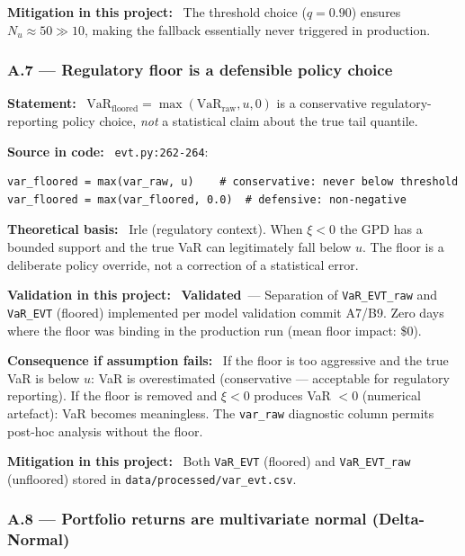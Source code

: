 \documentclass[11pt,a4paper]{article}
\newcommand{\asmfield}[1]{\medskip\noindent\textbf{#1:}\ }
\newcommand{\code}[1]{\texttt{#1}}
\newcommand{\validated}{\textbf{Validated}}
\begin{document}
\asmfield{Mitigation in this project}
The threshold choice ($q = 0.90$) ensures $N_u \approx 50 \gg 10$,
making the fallback essentially never triggered in production.

\subsubsection{A.7 --- Regulatory floor is a defensible policy choice}\label{asm:A7}

\asmfield{Statement}
$\text{VaR}_{\text{floored}} = \max(\text{VaR}_{\text{raw}}, u, 0)$ is a
conservative regulatory-reporting policy choice, \emph{not} a statistical
claim about the true tail quantile.

\asmfield{Source in code}
\code{evt.py:262-264}:
\begin{lstlisting}
var_floored = max(var_raw, u)    # conservative: never below threshold
var_floored = max(var_floored, 0.0)  # defensive: non-negative
\end{lstlisting}

\asmfield{Theoretical basis}
Irle (regulatory context). When $\xi < 0$ the GPD has a bounded support
and the true VaR can legitimately fall below $u$. The floor is a
deliberate policy override, not a correction of a statistical error.

\asmfield{Validation in this project}
\validated\ --- Separation of \code{VaR\_EVT\_raw} and \code{VaR\_EVT}
(floored) implemented per model validation commit A7/B9. Zero days where
the floor was binding in the production run (mean floor impact: \$0).

\asmfield{Consequence if assumption fails}
If the floor is too aggressive and the true VaR is below $u$: VaR is
overestimated (conservative --- acceptable for regulatory reporting). If
the floor is removed and $\xi < 0$ produces VaR $< 0$ (numerical artefact):
VaR becomes meaningless. The \code{var\_raw} diagnostic column permits
post-hoc analysis without the floor.

\asmfield{Mitigation in this project}
Both \code{VaR\_EVT} (floored) and \code{VaR\_EVT\_raw} (unfloored)
stored in \code{data/processed/var\_evt.csv}.

\subsubsection{A.8 --- Portfolio returns are multivariate normal (Delta-Normal)}\label{asm:A8}
\end{document}
